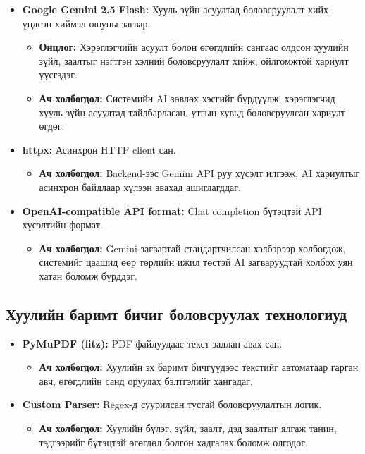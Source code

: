 \begin{itemize}

    \item \textbf{Google Gemini 2.5 Flash:} Хууль зүйн асуултад боловсруулалт хийх үндсэн хиймэл оюуны загвар.
    \begin{itemize}
        \item \textbf{Онцлог:} Хэрэглэгчийн асуулт болон өгөгдлийн сангаас олдсон хуулийн зүйл, заалтыг нэгтгэн хэлний боловсруулалт хийж, ойлгомжтой хариулт үүсгэдэг.
        \item \textbf{Ач холбогдол:} Системийн AI зөвлөх хэсгийг бүрдүүлж, хэрэглэгчид хууль зүйн асуултад тайлбарласан, утгын хувьд боловсруулсан хариулт өгдөг.
    \end{itemize}

    \item \textbf{httpx:} Асинхрон HTTP client сан.
    \begin{itemize}
        \item \textbf{Ач холбогдол:} Backend-ээс Gemini API руу хүсэлт илгээж, AI хариултыг асинхрон байдлаар хүлээн авахад ашиглагддаг.
    \end{itemize}

    \item \textbf{OpenAI-compatible API format:} Chat completion бүтэцтэй API хүсэлтийн формат.
    \begin{itemize}
        \item \textbf{Ач холбогдол:} Gemini загвартай стандартчилсан хэлбэрээр холбогдож, системийг цаашид өөр төрлийн ижил төстэй AI загваруудтай холбох уян хатан боломж бүрддэг.
    \end{itemize}

\end{itemize}

\subsection{Хуулийн баримт бичиг боловсруулах технологиуд}

\begin{itemize}

    \item \textbf{PyMuPDF (fitz):} PDF файлуудаас текст задлан авах сан.
    \begin{itemize}
        \item \textbf{Ач холбогдол:} Хуулийн эх баримт бичгүүдээс текстийг автоматаар гарган авч, өгөгдлийн санд оруулах бэлтгэлийг хангадаг.
    \end{itemize}

    \item \textbf{Custom Parser:} Regex-д суурилсан тусгай боловсруулалтын логик.
    \begin{itemize}
        \item \textbf{Ач холбогдол:} Хуулийн бүлэг, зүйл, заалт, дэд заалтыг ялгаж танин, тэдгээрийг бүтэцтэй өгөгдөл болгон хадгалах боломж олгодог.
    \end{itemize}

\end{itemize}

